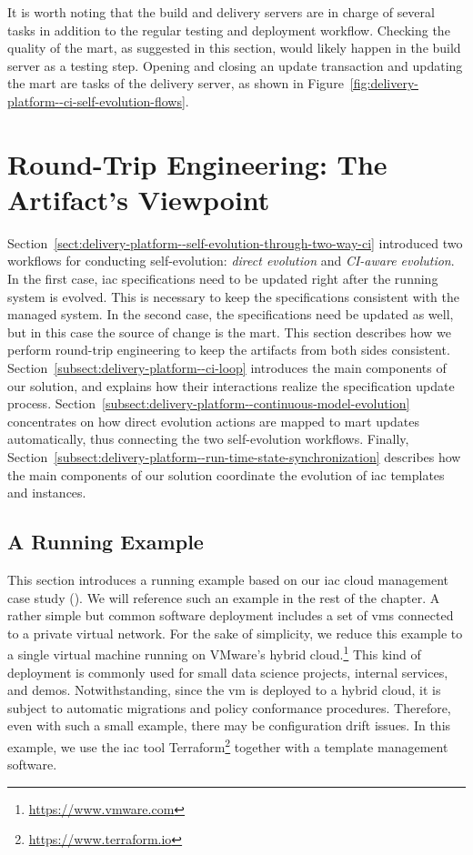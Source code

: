 It is worth noting that the build and delivery servers are in charge of several tasks in addition to the regular testing and deployment workflow. Checking the quality of the \gls{mart}, as suggested in this section, would likely happen in the build server as a testing step. Opening and closing an update transaction and updating the \gls{mart} are tasks of the delivery server, as shown in Figure~\ref{fig:delivery-platform--ci-self-evolution-flows}.


\section{Round-Trip Engineering: The Artifact's Viewpoint}
\label{sect:delivery-platform--round-trip-engineering}

Section~\ref{sect:delivery-platform--self-evolution-through-two-way-ci} introduced two workflows for conducting self-evolution: \emph{direct evolution} and \emph{CI-aware evolution}. In the first case, \gls{iac} specifications need to be updated right after the running system is evolved. This is necessary to keep the specifications consistent with the managed system. In the second case, the specifications need be updated as well, but in this case the source of change is the \gls{mart}. This section describes how we perform round-trip engineering to keep the artifacts from both sides consistent. Section~\ref{subsect:delivery-platform--ci-loop} introduces the main components of our solution, and explains how their interactions realize the specification update process. Section~\ref{subsect:delivery-platform--continuous-model-evolution} concentrates on how direct evolution actions are mapped to \gls{mart} updates automatically, thus connecting the two self-evolution workflows. Finally, Section~\ref{subsect:delivery-platform--run-time-state-synchronization} describes how the main components of our solution coordinate the evolution of \gls{iac} templates and instances.

\subsection{A Running Example}
\label{subsect:delivery-platform--running-example}

This section introduces a running example based on our \gls{iac} cloud management case study (). We will reference such an example in the rest of the chapter. A rather simple but common software deployment includes a set of \glspl{vm} connected to a private virtual network. For the sake of simplicity, we reduce this example to a single virtual machine running on VMware's hybrid cloud.\footnote{\url{https://www.vmware.com}} This kind of deployment is commonly used for small data science projects, internal services, and demos. Notwithstanding, since the \gls{vm} is deployed to a hybrid cloud, it is subject to automatic migrations and policy conformance procedures. Therefore, even with such a small example, there may be configuration drift issues. In this example, we use the \gls{iac} tool Terraform\footnote{\url{https://www.terraform.io}} together with a template management software.

